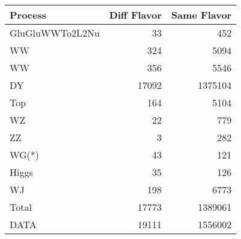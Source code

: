 \begin{table}[ht]
	\centering
\begin{tabular}{lrr}

         Process &  Diff Flavor &  Same Flavor \\
		\hline
 GluGluWWTo2L2Nu &           33 &          452 \\
              WW &          324 &         5094 \\
              WW &          356 &         5546 \\
              DY &        17092 &      1375104 \\
             Top &          164 &         5104 \\
              WZ &           22 &          779 \\
              ZZ &            3 &          282 \\
           WG(*) &           43 &          121 \\
           Higgs &           35 &          126 \\
              WJ &          198 &         6773 \\
\hline
           Total &        17773 &      1389061 \\
            DATA &        19111 &      1556002 \\


\end{tabular}

\end{table}